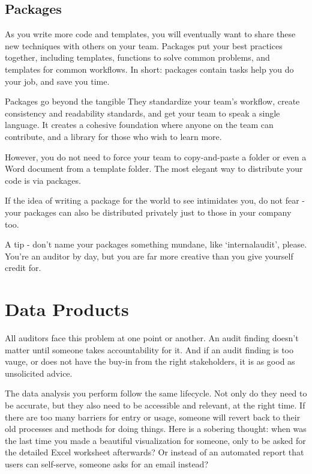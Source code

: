 \documentclass[
]{book}
\begin{document}
\hypertarget{packages}{%
\subsection{Packages}\label{packages}}

As you write more code and templates, you will eventually want to share these new techniques with others on your team. Packages put your best practices together, including templates, functions to solve common problems, and templates for common workflows. In short: packages contain tasks help you do your job, and save you time.

Packages go beyond the tangible They standardize your team's workflow, create consistency and readability standards, and get your team to speak a single language. It creates a cohesive foundation where anyone on the team can contribute, and a library for those who wish to learn more.

However, you do not need to force your team to copy-and-paste a folder or even a Word document from a template folder. The most elegant way to distribute your code is via packages.

If the idea of writing a package for the world to see intimidates you, do not fear - your packages can also be distributed privately just to those in your company too.

A tip - don't name your packages something mundane, like `internalaudit', please. You're an auditor by day, but you are far more creative than you give yourself credit for.

\hypertarget{data-products}{%
\section{Data Products}\label{data-products}}

All auditors face this problem at one point or another. An audit finding doesn't matter until someone takes accountability for it. And if an audit finding is too vauge, or does not have the buy-in from the right stakeholders, it is as good as unsolicited advice.

The data analysis you perform follow the same lifecycle. Not only do they need to be accurate, but they also need to be accessible and relevant, at the right time. If there are too many barriers for entry or usage, someone will revert back to their old processes and methods for doing things. Here is a sobering thought: when was the last time you made a beautiful visualization for someone, only to be asked for the detailed Excel worksheet afterwards? Or instead of an automated report that users can self-serve, someone asks for an email instead?
\end{document}
